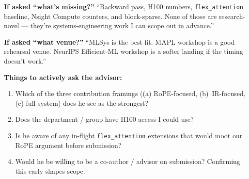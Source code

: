 \documentclass[11pt]{article}
\begin{document}
\textbf{If asked ``what's missing?''}
``Backward pass, H100 numbers, \texttt{flex\_attention} baseline, Nsight
Compute counters, and block-sparse. None of those are research-novel ---
they're systems-engineering work I can scope out in advance.''

\textbf{If asked ``what venue?''}
``MLSys is the best fit. MAPL workshop is a good rehearsal venue. NeurIPS
Efficient-ML workshop is a softer landing if the timing doesn't work.''

\textbf{Things to actively ask the advisor:}
\begin{enumerate}[leftmargin=1.4em,itemsep=1pt]
  \item Which of the three contribution framings ((a) RoPE-focused,
        (b)~IR-focused, (c) full system) does he see as the strongest?
  \item Does the department / group have H100 access I could use?
  \item Is he aware of any in-flight \texttt{flex\_attention} extensions
        that would moot our RoPE argument before submission?
  \item Would he be willing to be a co-author / advisor on submission?
        Confirming this early shapes scope.
\end{enumerate}
\end{document}
